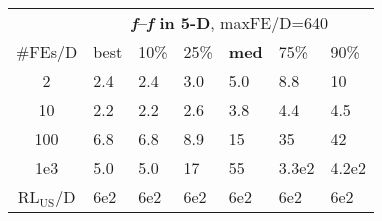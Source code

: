 \begin{tabular}{c|llllll}
 & \multicolumn{6}{|c}{\textbf{\textit{f}\raisebox{-0.35ex}{1}--\textit{f}\raisebox{-0.35ex}{3} in 5-D}, maxFE/D=640}\\
\#FEs/D & best & 10\% & 25\% & \textbf{med} & 75\% & 90\%\\
2 & \hspace*{1ex}2.4 & \hspace*{1ex}2.4 & \hspace*{1ex}3.0 & \hspace*{1ex}5.0 & \hspace*{1ex}8.8 & 10\\
10 & \hspace*{1ex}2.2 & \hspace*{1ex}2.2 & \hspace*{1ex}2.6 & \hspace*{1ex}3.8 & \hspace*{1ex}4.4 & \hspace*{1ex}4.5\\
100 & \hspace*{1ex}6.8 & \hspace*{1ex}6.8 & \hspace*{1ex}8.9 & 15 & 35 & 42\\
1e3 & \hspace*{1ex}5.0 & \hspace*{1ex}5.0 & 17 & 55 & 3.3e2 & 4.2e2\\
$\text{RL}_{\text{US}}$/D & 6e2 & 6e2 & 6e2 & 6e2 & 6e2 & 6e2
\end{tabular}
